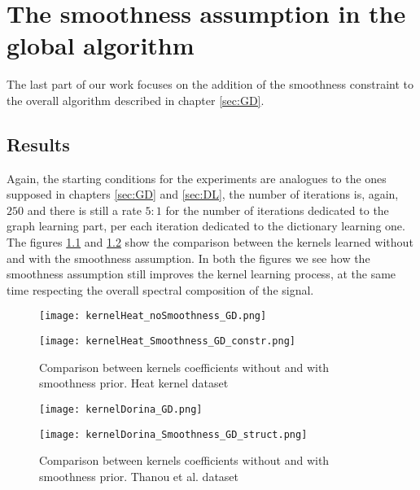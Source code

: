 \chapter{The smoothness assumption in the global algorithm}
The last part of our work focuses on the addition of the smoothness constraint to the overall algorithm described in chapter \ref{sec:GD}.
\section{Results}
Again, the starting conditions for the experiments are analogues to the ones supposed in chapters \ref{sec:GD} and \ref{sec:DL}, the number of iterations is, again, $250$ and there is still a rate $5:1$ for the number of iterations dedicated to the graph learning part, per each iteration dedicated to the dictionary learning one.
\\

The figures \ref{fig:alphaHeatGD_smth} and \ref{fig:alphaDorinaGD_smth} show the comparison between the kernels learned without and with the smoothness assumption. In both the figures we see how the smoothness assumption still improves the kernel learning process, at the same time respecting the overall spectral composition of the signal.

\begin{figure}
  \centering
  \begin{minipage}[c]{.8\textwidth}
    \centering
    \texttt{[image: kernelHeat\_noSmoothness\_GD.png]}
  \end{minipage}
  \begin{minipage}[c]{.8\textwidth}
    \centering
    \texttt{[image: kernelHeat\_Smoothness\_GD\_constr.png]}
  \end{minipage}
  \caption{Comparison between kernels coefficients without and with smoothness prior. Heat kernel dataset}
  \label{fig:alphaHeatGD_smth}
\end{figure}

\begin{figure}
  \centering
  \begin{minipage}[c]{.8\textwidth}
    \centering
    \texttt{[image: kernelDorina\_GD.png]}
  \end{minipage}
  \begin{minipage}[c]{.8\textwidth}
    \centering
    \texttt{[image: kernelDorina\_Smoothness\_GD\_struct.png]}
  \end{minipage}
  \caption{Comparison between kernels coefficients without and with smoothness prior. Thanou et al. dataset}
  \label{fig:alphaDorinaGD_smth}
\end{figure}

